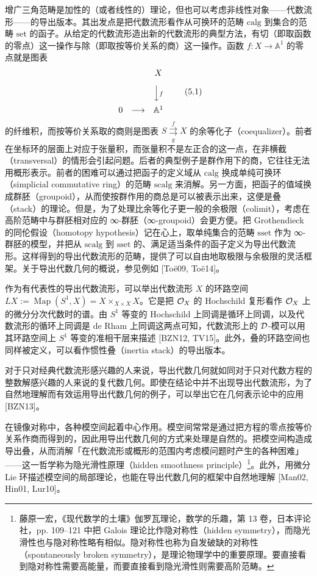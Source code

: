 增广三角范畴是加性的（或者线性的）理论，但也可以考虑非线性对象——代数流形——的导出版本。其出发点是把代数流形看作从可换环的范畴 $\mathrm{calg}$ 到集合的范畴 $\mathrm{set}$ 的函子。从给定的代数流形造出新的代数流形的典型方法，有切（即取函数的零点）这一操作与除（即取按等价关系的商）这一操作。函数 $f\colon X\to\mathbb{A}^1$ 的零点就是图表
\begin{equation}
  \begin{array}{ccc}
    & & X\\[8pt]
    & & \Big\downarrow{\scriptstyle f}\\[8pt]
    0 & \longrightarrow & \mathbb{A}^1
  \end{array} \tag{5.1}
\end{equation}
的纤维积，而按等价关系取的商则是图表 $S\overset{f}{\underset{g}{\rightrightarrows}}X$ 的余等化子（coequalizer）。前者在坐标环的层面上对应于张量积，而张量积不是左正合的这一点，在非横截（transversal）的情形会引起问题。后者的典型例子是群作用下的商，它往往无法用概形表示。前者的困难可以通过把函子的定义域从 $\mathrm{calg}$ 换成单纯可换环（simplicial commutative ring）的范畴 $\mathrm{scalg}$ 来消解。另一方面，把函子的值域换成群胚（groupoid），从而使按群作用的商总是可以被表示出来，这便是叠（stack）的理论。但是，为了处理比余等化子更一般的余极限（colimit），考虑在高阶范畴中与群胚相对应的 ∞-群胚（∞-groupoid）会更方便。把 Grothendieck 的同伦假设（homotopy hypothesis）记在心上，取单纯集合的范畴 $\mathrm{sset}$ 作为 ∞-群胚的模型，并把从 $\mathrm{scalg}$ 到 $\mathrm{sset}$ 的、满足适当条件的函子定义为导出代数流形。这样得到的导出代数流形的范畴，提供了可以自由地取极限与余极限的灵活框架。关于导出代数几何的概说，参见例如 [Toë09, Toë14]。

作为有代表性的导出代数流形，可以举出代数流形 $X$ 的环路空间 $LX:=\operatorname{Map}(S^1,X)=X\times_{X\times X}X$。它是把 $\mathcal{O}_X$ 的 Hochschild 复形看作 $\mathcal{O}_X$ 上的微分分次代数时的谱。由 $S^1$ 等变的 Hochschild 上同调是循环上同调，以及代数流形的循环上同调是 de Rham 上同调这两点可知，代数流形上的 $\mathcal{D}$-模可以用其环路空间上 $S^1$ 等变的准相干层来描述 [BZN12, TV15]。此外，叠的环路空间也同样被定义，可以看作惯性叠（inertia stack）的导出版本。

对于只对经典代数流形感兴趣的人来说，导出代数几何就如同对于只对代数方程的整数解感兴趣的人来说的复代数几何。即使在结论中并不出现导出代数流形，为了自然地理解而有效运用导出代数几何的例子，可以举出它在几何表示论中的应用 [BZN13]。

在镜像对称中，各种模空间起着中心作用。模空间常常是通过把方程的零点按等价关系作商而得到的，因此用导出代数几何的方式来处理是自然的。把模空间构造成导出叠，从而消解「在代数流形或概形的范围内考虑模问题时产生的各种困难」——这一哲学称为隐光滑性原理（hidden smoothness principle）\footnote{藤原一宏，《现代数学的土壤》伽罗瓦理论，数学的乐趣，第 13 卷，日本评论社，pp. 109–121 中把 Galois 理论比作隐对称性（hidden symmetry），而隐光滑性也与隐对称性略有相似。隐对称性也称为自发破缺的对称性（spontaneously broken symmetry），是理论物理学中的重要原理。要直接看到隐对称性需要高能量，而要直接看到隐光滑性则需要高阶范畴。}。此外，用微分 Lie 环描述模空间的局部理论，也能在导出代数几何的框架中自然地理解 [Man02, Hin01, Lur10]。

